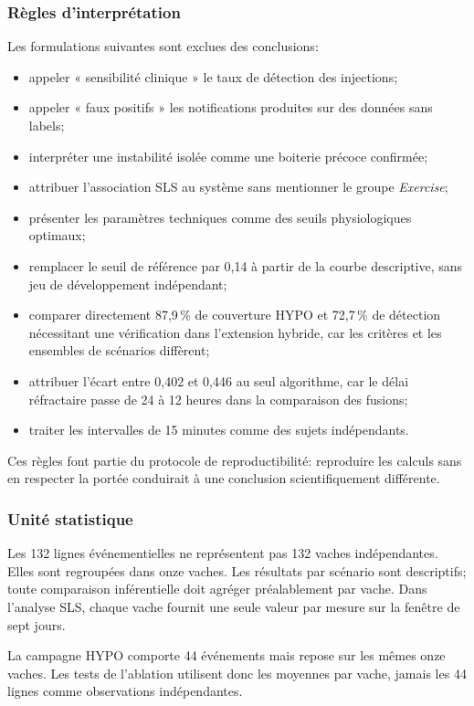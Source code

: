 \subsubsection{Règles d'interprétation}
Les formulations suivantes sont exclues des conclusions:
\begin{itemize}
  \item appeler « sensibilité clinique » le taux de détection des injections;
  \item appeler « faux positifs » les notifications produites sur des données sans labels;
  \item interpréter une instabilité isolée comme une boiterie précoce confirmée;
  \item attribuer l'association SLS au système sans mentionner le groupe \textit{Exercise};
  \item présenter les paramètres techniques comme des seuils physiologiques optimaux;
  \item remplacer le seuil de référence par 0,14 à partir de la courbe descriptive, sans
  jeu de développement indépendant;
  \item comparer directement 87,9\,\% de couverture HYPO et 72,7\,\% de détection
  nécessitant une vérification dans l'extension hybride, car les critères et les ensembles de scénarios diffèrent;
  \item attribuer l'écart entre 0,402 et 0,446 au seul algorithme, car le délai réfractaire
  passe de 24 à 12 heures dans la comparaison des fusions;
  \item traiter les intervalles de 15 minutes comme des sujets indépendants.
\end{itemize}

Ces règles font partie du protocole de reproductibilité: reproduire les calculs sans en
respecter la portée conduirait à une conclusion scientifiquement différente.

\subsubsection{Unité statistique}
Les 132 lignes événementielles ne représentent pas 132 vaches indépendantes. Elles sont
regroupées dans onze vaches. Les résultats par scénario sont descriptifs; toute comparaison
inférentielle doit agréger préalablement par vache. Dans l'analyse SLS, chaque vache fournit
une seule valeur par mesure sur la fenêtre de sept jours.

La campagne HYPO comporte 44 événements mais repose sur les mêmes onze vaches. Les tests de
l'ablation utilisent donc les moyennes par vache, jamais les 44 lignes comme observations
indépendantes.

